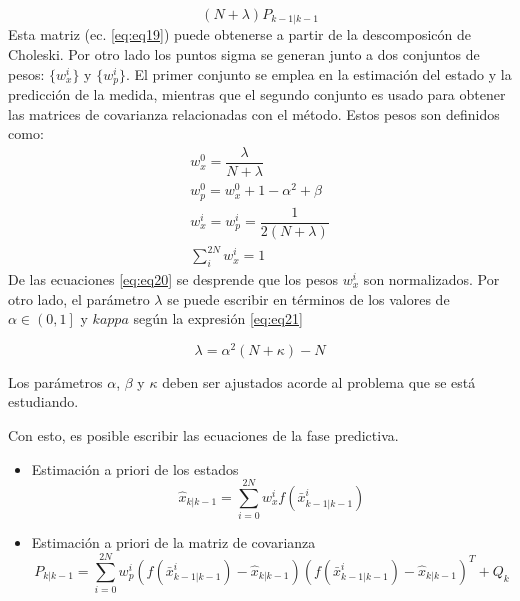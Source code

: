 \begin{enumerate}
 \begin{equation}
 (N+\lambda) P_{k-1 | k-1}
 \label{eq:eq19}
 \end{equation}
Esta matriz (ec. \ref{eq:eq19}) puede obtenerse a partir de la descomposic\'on de Choleski. Por otro lado los puntos sigma se generan junto a dos conjuntos de pesos: $\lbrace w_x^{i} \rbrace$ y $\lbrace w_p^{i} \rbrace$. El primer conjunto se emplea en la estimaci\'on del estado y la predicci\'on de la medida, mientras que el segundo conjunto es usado para obtener las matrices de covarianza relacionadas con el m\'etodo. Estos pesos son definidos como:
\begin{equation}
\label{eq:eq20}
\begin{gathered}
w^0_x = \dfrac{\lambda}{N+\lambda}\\
w^0_p = w^0_x + 1 - \alpha^2 + \beta\\
w^i_x = w^i_p = \dfrac{1}{2(N+\lambda)}\\
\sum_i^{2N} w^i_x = 1
\end{gathered}
\end{equation}
De las ecuaciones \ref{eq:eq20} se desprende que los pesos $w_x^i$ son normalizados. Por otro lado, el par\'ametro $\lambda$ se puede escribir en t\'erminos de los valores de $\alpha \in \left( 0,1\right]$ y $kappa$ seg\'un la expresi\'on \ref{eq:eq21}

\begin{equation}
\label{eq:eq21}
\lambda = \alpha^2  (N + \kappa)- N
\end{equation}

Los par\'ametros $\alpha$, $\beta$ y $\kappa$ deben ser ajustados acorde al problema que se est\'a estudiando.
\bigskip

Con esto, es posible escribir las ecuaciones de la fase predictiva.
\begin{itemize}
\item Estimaci\'on a priori de los estados\\
\begin{equation}
\label{eq:eq22}
\hat{x}_{k|k-1} = \sum_{i=0}^{2N} w_{x}^i f(\bar{x}^i_{k-1|k-1})
\end{equation}

\item Estimaci\'on a priori de la matriz de covarianza\\

\begin{equation}
\label{eq:eq23}
P_{k|k-1} = \sum_{i=0}^{2N} w_p^i \left( f(\bar{x}^i_{k-1|k-1})  - \hat{x}_{k|k-1}\right)\left( f(\bar{x}^i_{k-1|k-1}) - \hat{x}_{k|k-1}  \right)^T + Q_k
\end{equation}
\end{itemize}



\end{enumerate}
